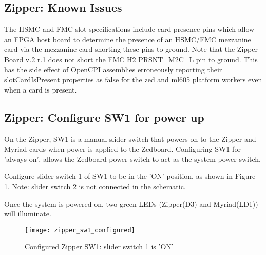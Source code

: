 \normalsize
\subsection*{Zipper: Known Issues}
The HSMC and FMC slot specifications include card presence pins which allow an FPGA host board to determine the presence of an HSMC/FMC mezzanine card via the mezzanine card shorting these pins to ground. Note that the Zipper Board v.2 r.1 does not short the FMC H2 PRSNT\_M2C\_L pin to ground. This has the side effect of OpenCPI assemblies erroneously reporting their slotCardIsPresent properties as false for the zed and ml605 platform workers even when a card is present.\par\medskip
\subsection*{Zipper: Configure SW1 for power up}
On the Zipper, SW1 is a manual slider switch that powers on to the Zipper and Myriad cards when power is applied to the Zedboard.  Configuring SW1 for 'always on', allows the Zedboard power switch to act as the system power switch.\par\medskip
\noindent Configure slider switch 1 of SW1 to be in the 'ON' position, as shown in Figure \ref{fig:zipper_sw1_configured}. Note: slider switch 2 is not connected in the schematic.\par\medskip
\noindent Once the system is powered on, two green LEDs (Zipper(D3) and Myriad(LD1)) will illuminate.\par\smallskip
	\begin{figure}[ht]
		\begin{center}
		\texttt{[image: zipper\_sw1\_configured]}
		\caption{Configured Zipper SW1: slider switch 1 is 'ON'}
		\label{fig:zipper_sw1_configured}
		\end{center}
	\end{figure}
\pagebreak

\normalsize
